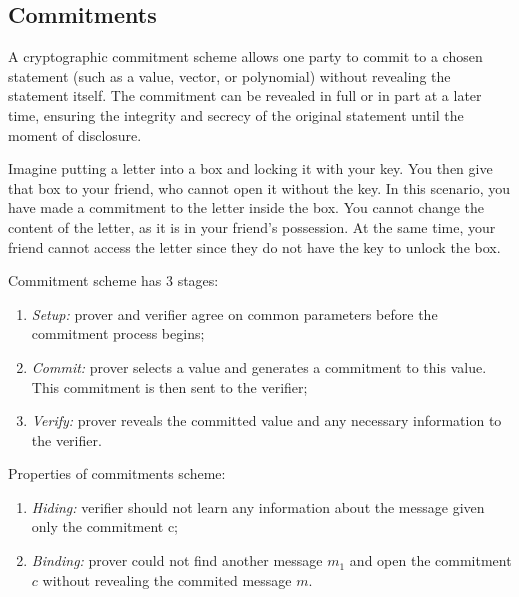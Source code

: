 \documentclass[../lecture-notes.tex]{subfiles}
\begin{document}
\subsection{Commitments}

\begin{definition}
    A cryptographic commitment scheme allows one party to commit to a chosen statement (such as a value, vector, or polynomial) without revealing the statement itself. The commitment can be revealed in full or in part at a later time, ensuring the integrity and secrecy of the original statement until the moment of disclosure.
\end{definition}

Imagine putting a letter into a box and locking it with your key. 
You then give that box to your friend, who cannot open it without the key.
In this scenario, you have made a commitment to the letter inside the box. 
You cannot change the content of the letter, as it is in your friend's possession. 
At the same time, your friend cannot access the letter since they do not have the key to unlock the box.



Commitment scheme has 3 stages:
\begin{enumerate}
    \item \textit{Setup:}  prover and verifier agree on common parameters before the commitment process begins;

    \item \textit{Commit:} prover selects a value and generates a commitment to this value. This commitment is then sent to the verifier;

    \item  \textit{Verify:} prover reveals the committed value and any necessary information to the verifier. 
\end{enumerate}

Properties of commitments scheme:
\begin{enumerate}
    \item \textit{Hiding: } verifier should not learn any information about the message given only the commitment c;
    \item \textit{Binding: } prover could not find another message $m_1$ and open the commitment $c$ without revealing the commited message $m$.
\end{enumerate}
\end{document}
